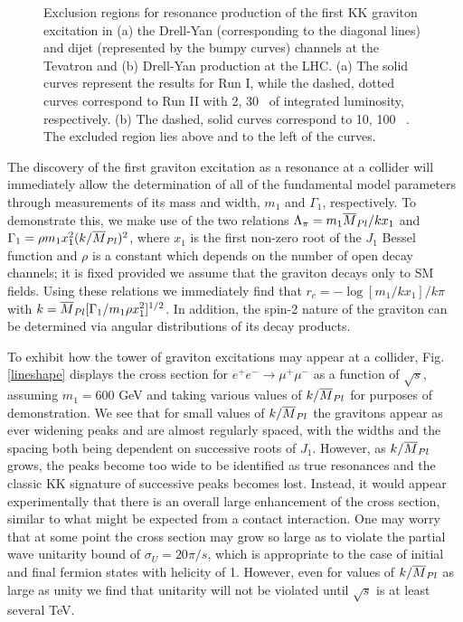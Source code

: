 \nn
\begin{figure}[htbp]
\centerline{
}
\vspace*{0.25cm}
\centerline{
}
\vspace*{0.25cm}
\caption{Exclusion regions for resonance production of the first KK graviton
excitation in (a) the Drell-Yan (corresponding to the diagonal lines)
and dijet (represented by the bumpy curves) channels at the Tevatron and (b)
Drell-Yan production at the LHC.  (a) The solid curves represent the results
for Run I, while the dashed, dotted curves correspond to Run II with 2, 30
\infb\ of integrated luminosity, respectively.  
(b) The dashed, solid curves correspond to
10, 100 \infb\ . The excluded region lies above and to the left of the curves.}
\label{bumps}
\end{figure}

The discovery of the first graviton excitation as a resonance at a collider 
will immediately allow the determination of all of the fundamental model 
parameters through measurements of its mass and width, $m_1$ and $\Gamma_1$, 
respectively. To demonstrate this, we make use of the two relations 
$\Lambda_\pi=m_1\mpl/kx_1$ and $\Gamma_1=\rho m_1x_1^2(k/\mpl)^2$, where 
$x_1$ is the first non-zero root of the $J_1$ Bessel function and $\rho$ is 
a constant which depends on the number of open decay channels; it is fixed 
provided we assume that the graviton decays only to SM fields. Using these 
relations we immediately find that $r_c=-\log[m_1/kx_1]/k\pi$ with
$k=\mpl[\Gamma_1/m_1\rho x_1^2]^{1/2}$. 
In addition, the spin-2 nature of the graviton can be determined via
angular distributions of its decay products.

To exhibit how the tower of graviton excitations may appear at a collider, 
Fig. \ref{lineshape} displays the cross section for $e^+e^- \to \mu^+\mu^-$
as a function of $\sqrt s$, 
assuming $m_1=600$ GeV and taking various values of $k/\mpl$ for purposes of 
demonstration. We see that for small values of $k/\mpl$ the gravitons appear 
as ever widening peaks and are almost regularly spaced, with the widths and 
the spacing both being dependent on successive roots of $J_1$.
However, as $k/\mpl$ grows, the peaks become too wide to be  
identified as true resonances and the classic KK signature of successive 
peaks becomes lost. Instead, it would appear experimentally that there is an 
overall large enhancement of the 
cross section, similar to what might be expected from a contact interaction. One 
may worry that at some point the cross section may grow so large as to 
violate the partial wave unitarity bound of $\sigma_U=20\pi/s$, which is 
appropriate\cite{jimbo} to the case of initial and final fermion
states with helicity 
of 1.  However, even for values of $k/\mpl$ as large as unity we find that
unitarity will not be violated until $\sqrt s$ is at least several TeV. 


